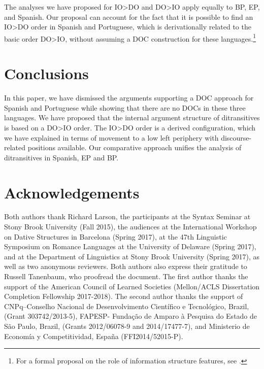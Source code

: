 \documentclass[output=paper,colorlinks,citecolor=brown]{./langscibook}
\begin{document}
The analyses we have proposed for IO>DO and DO>IO apply equally to BP, EP, and Spanish. Our proposal can account for the fact that it is possible to find an IO>DO order in Spanish and Portuguese, which is derivationally related to the basic order DO>IO, without assuming a DOC construction for these languages.\footnote{For a formal proposal on the role of information structure features, see \citet{CépedaCyrino2017}.}

\section{Conclusions}\label{sec:cepeda:4}

In this paper, we have dismissed the arguments supporting a DOC approach for Spanish and Portuguese while showing that there are no DOCs in these three languages. We have proposed that the internal argument structure of ditransitives is based on a DO>IO order. The IO>DO order is a derived configuration, which we have explained in terms of movement to a low left periphery with discourse-related positions available. Our comparative approach unifies the analysis of ditransitives in Spanish, EP and BP.


\section*{Acknowledgements}
Both authors thank Richard Larson, the participants at the Syntax Seminar at Stony Brook University (Fall 2015), the audiences at the International Workshop on Dative Structures in Barcelona (Spring 2017), at the 47th Linguistic Symposium on Romance Languages at the University of Delaware (Spring 2017), and at the Department of Linguistics at Stony Brook University (Spring 2017), as well as two anonymous reviewers. Both authors also express their gratitude to Russell Tanenbaum, who proofread the document. The first author thanks the support of the American Council of Learned Societies (Mellon/ACLS Dissertation Completion Fellowship 2017-2018). The second author thanks the support of CNPq–Conselho Nacional de Desenvolvimento Científico e Tecnológico, Brazil, (Grant 303742/2013-5), FAPESP- Fundação de Amparo à Pesquisa do Estado de São Paulo, Brazil, (Grants 2012/06078-9 and 2014/17477-7), and Ministerio de Economía y Competitividad, España (FFI2014/52015-P).

\sloppy\printbibliography[heading=subbibliography,notkeyword=this]
\end{document}
